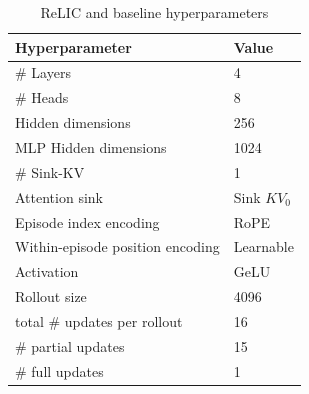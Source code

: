 \documentclass{article}
\newcommand{\method}{ReLIC\xspace}
\begin{document}
\begin{table}[!h]
    \centering
    \medskip
  \begin{tabular}{ll}
    \toprule
    Hyperparameter     & Value \\
    \midrule
    \# Layers & 4 \\
    \# Heads & 8 \\
    Hidden dimensions & 256 \\
    MLP Hidden dimensions & 1024 \\
    \# Sink-KV & 1 \\
    Attention sink & Sink $KV_0$ \\
    Episode index encoding & RoPE \cite{su2023roformer} \\
    Within-episode position encoding & Learnable \\
    Activation & GeLU \cite{shazeer2020glu} \\
    Rollout size & 4096 \\
    total \# updates per rollout & 16 \\
    \# partial updates & 15 \\
    \# full updates & 1 \\
    \bottomrule
  \end{tabular}
  \centering
  \caption{\method and baseline hyperparameters}
  \label{tab:method-hparam}
  \label{tab:transformer-hparam}
\end{table}
\end{document}
